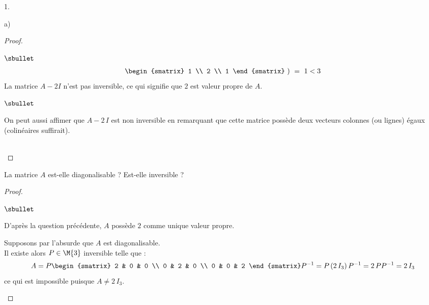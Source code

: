 \begin{noliste}{1.}
\begin{noliste}{a)}
\begin{proof}
\begin{noliste}{$\sbullet$}
\[\begin{array}{rcl}
{\begin{smatrix}
              1 \\ 
              2 \\
              1
            \end{smatrix} %
          } \ ) %
          \ = \ 1 <3
        \end{array}        
        \]
	La matrice $A-2I$ n'est pas inversible, ce qui signifie que
        $2$ est valeur propre de $A$.
      \end{noliste}
      \begin{remark}%
        \begin{noliste}{$\sbullet$}
        \item On peut aussi affimer que $A - 2 \, I$ est non
          inversible en remarquant que cette matrice possède deux
          vecteurs colonnes (ou lignes) égaux (colinéaires suffirait).
        \end{noliste}
      \end{remark}
      ~\\[-1.2cm]
    \end{proof}		

  \item La matrice $A$ est-elle diagonalisable ? Est-elle inversible ?
  \end{noliste}

    \begin{proof}~
      \begin{noliste}{$\sbullet$}
      \item D'après la question précédente, $A$ possède $2$ comme
        unique valeur propre. %
      \item Supposons par l'absurde que $A$ est diagonalisable.\\
        Il existe alors $P \in \M{3}$ inversible telle que : 
        \[
        A = P
        \begin{smatrix}
          2 & 0 & 0 \\
          0 & 2 & 0 \\
          0 & 0 & 2           
        \end{smatrix}
        P^{-1} %
        = %
        P \, (2 \, I_3) \, P^{-1} %
        = %
        2 \, PP^{-1} %
        = %
        2 \, I_3
        \]
        ce qui est impossible puisque $A \neq 2 \, I_3$.%
	

\end{noliste}
\end{proof}
\end{noliste}
